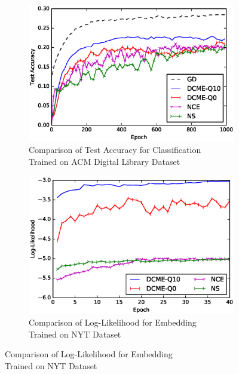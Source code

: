 \begin{figure}
  \centering
        \begin{subfigure}[h]{0.7\textwidth}
            \centering
            \includegraphics[width=\linewidth]{dcme/classification.eps}
            \captionsetup{justification=centering}
            \caption{Comparison of Test Accuracy for Classification\\
              Trained on ACM Digital Library Dataset}
            \label{fig::classification}
        \end{subfigure}
        \hfill
        \begin{subfigure}[h]{0.7\textwidth}
            \centering
            \includegraphics[width=\linewidth]{dcme/word_embedding.eps}
            \captionsetup{justification=centering}
            \caption{Comparison of Log-Likelihood for Embedding \\
              Trained on NYT Dataset}

\end{subfigure}
\end{figure}
